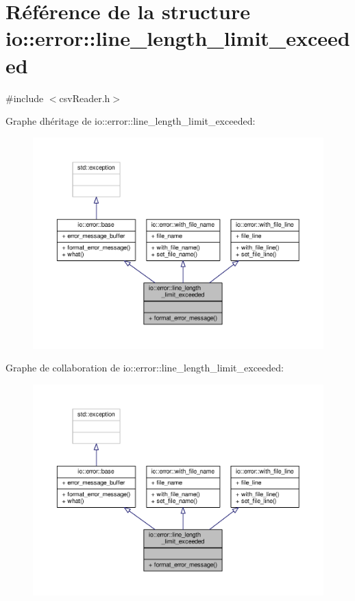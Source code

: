\hypertarget{structio_1_1error_1_1line__length__limit__exceeded}{}\section{Référence de la structure io\+:\+:error\+:\+:line\+\_\+length\+\_\+limit\+\_\+exceeded}
\label{structio_1_1error_1_1line__length__limit__exceeded}


{\ttfamily \#include $<$csv\+Reader.\+h$>$}



Graphe d\textquotesingle{}héritage de io\+:\+:error\+:\+:line\+\_\+length\+\_\+limit\+\_\+exceeded\+:
\nopagebreak
\begin{figure}[H]
\begin{center}
\leavevmode
\includegraphics[width=350pt]{structio_1_1error_1_1line__length__limit__exceeded__inherit__graph}
\end{center}
\end{figure}


Graphe de collaboration de io\+:\+:error\+:\+:line\+\_\+length\+\_\+limit\+\_\+exceeded\+:
\nopagebreak
\begin{figure}[H]
\begin{center}
\leavevmode
\includegraphics[width=350pt]{structio_1_1error_1_1line__length__limit__exceeded__coll__graph}
\end{center}
\end{figure}
